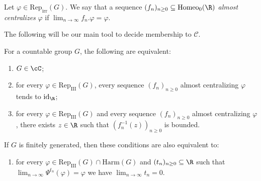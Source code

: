\documentclass[reqno]{amsart}
\begin{document}
\begin{defn}
Let $\varphi\in \mathrm{Rep}_\mathrm{irr}(G)$. We say that a sequence  $(f_n)_{n \geq 0} \subseteq \mathrm{Homeo}_0(\R)$ \emph{almost centralizes} $\varphi$ if $\lim_{n \to \infty} f_n.\varphi = \varphi$.
\end{defn}
The following will be our main tool to decide membership to $\mathcal{C}$.
\begin{teo} \label{cor:criterio}

For a countable group $G$, the following are equivalent:
\begin{enumerate}
    \item \label{i-GinC} $G\in \cC$;
    \item \label{i-approxtrivial} for every $\varphi \in \mathrm{Rep}_\mathrm{III}(G)$, every sequence $(f_n)_{n \geq 0}$ almost centralizing $\varphi$ tends to $\mathrm{id}_\R$;
    \item \label{i-approxbounded} for every $\varphi \in \mathrm{Rep}_\mathrm{III}(G)$ and every sequence $(f_n)_{n \geq 0}$ almost centralizing $\varphi$, there exists $z \in \R$ such that $(f_n^{-1}(z))_{n \geq 0}$ is bounded.
\end{enumerate}

If $G$ is finitely generated, then these conditions are also equivalent to:
\begin{enumerate}[resume]
    \item\label{i-approxderoin} for every $\varphi \in \mathrm{Rep}_\mathrm{III}(G) \cap \mathrm{Harm}(G)$ and $(t_n)_{n \geq 0} \subseteq \R$ such that $\lim_{n \to \infty} \Psi^{t_n}(\varphi) = \varphi$ we have $\lim_{n \to \infty} t_n = 0$.
\end{enumerate}
\end{teo}
\end{document}
